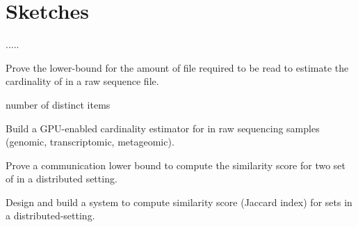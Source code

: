 \section{Sketches}



.....



\begin{rproblem}
Prove the lower-bound for the amount of file required to be read to estimate the cardinality of \kmer in a raw sequence file.
\end{rproblem}

number of distinct items

\begin{rproblem}
Build a GPU-enabled cardinality estimator for \kmers in raw sequencing samples (genomic, transcriptomic, metageomic).
\end{rproblem}

\begin{rproblem}
Prove a communication lower bound to compute the similarity score for two set of \kmers in a distributed setting.
\end{rproblem}


\begin{rproblem}
Design and build a system to compute similarity score (Jaccard index) for \kmer sets in a distributed-setting.
\end{rproblem}
